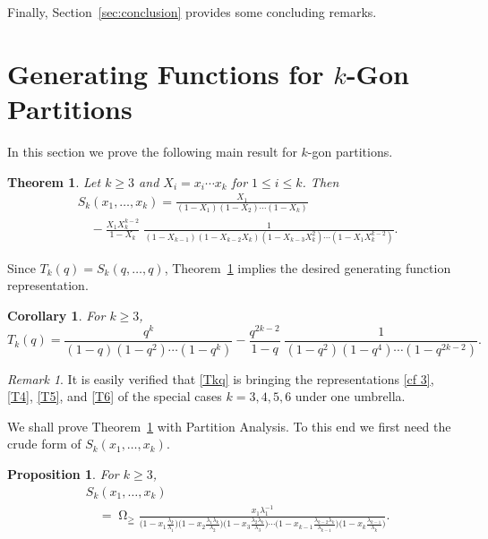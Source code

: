 \documentclass[reqno]{amsart}
\newcommand{\lam}{\lambda}
\DeclareMathOperator*{\Omegaoper}{\Omega}
\newcommand{\Omegaop}{\Omegaoper_{\scriptscriptstyle \geqq}}
\theoremstyle{plain}
\newtheorem{theorem}{Theorem}
\newtheorem{corollary}{Corollary}
\newtheorem{proposition}{Proposition}
\theoremstyle{definition}
\theoremstyle{remark}
\newtheorem*{remark}{Remark}
\begin{document}
Finally, Section~\ref{sec:conclusion} provides some concluding remarks.


\section{Generating Functions for $k$-Gon Partitions} \label{sec:genfu}

In this section we prove the following main result for $k$-gon
partitions.

\begin{theorem} \label{thm:1}
   Let $k \ge 3$ and $X_i = x_i \cdots x_k$ for $1 \le i \le k$.
   Then
   \begin{equation} \begin{split} \label{main}
      & S_k(x_1,\dots,x_k) = \frac{X_1}{(1-X_1)(1-X_2)\cdots(1-X_k)} \\
      & \quad - \frac{X_1 X_k^{k-2}}{1-X_k} \;
      \frac{1}{(1-X_{k-1})(1-X_{k-2}X_k)(1-X_{k-3}X_k^2)
      \cdots (1-X_1 X_k^{k-2})}.
   \end{split}\end{equation}
\end{theorem}

Since $T_k(q)=S_k(q,\dots,q)$, Theorem~\ref{thm:1} implies the
desired generating function representation.

\begin{corollary} \label{cor:1}
   For $k \ge 3$,
   \begin{equation} \label{Tkq}
      T_k(q) = \frac{q^k}{(1-q)(1-q^2)\cdots(1-q^k)}
      - \frac{q^{2k-2}}{1-q} \;
      \frac{1}{(1-q^2)(1-q^4) \cdots (1-q^{2k-2})}.
   \end{equation}
\end{corollary}

\begin{remark}
   It is easily verified that \eqref{Tkq} is bringing the
   representations \eqref{cf 3}, \eqref{T4}, \eqref{T5}, and \eqref{T6}
   of the special cases $k=3,4,5,6$ under one umbrella.
\end{remark}

We shall prove Theorem~\ref{thm:1} with Partition Analysis.
To this end we first need the crude form of $S_k(x_1,\dots,x_k)$.

\begin{proposition} \label{prop:2}
   For $k \ge 3$,
   \begin{equation}\begin{split} \label{SkO}
      & S_k(x_1,\dots,x_k) \\
      & \quad =
      \Omegaop \frac{x_1 \lam_1^{-1}}
      {\big(1-x_1 \frac{\lam_k}{\lam_1}\big)\big(1-x_2 \frac{\lam_1\lam_k}{\lam_
2}\big)
      \big(1-x_3 \frac{\lam_2\lam_k}{\lam_3}\big) \cdots
      \big(1-x_{k-1} \frac{\lam_{k-2}\lam_k}{\lam_{k-1}}\big)
      \big(1-x_k \frac{\lam_{k-1}}{\lam_k}\big)}.
   \end{split}\end{equation}
\end{proposition}
\end{document}
